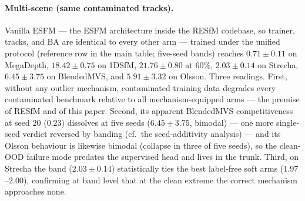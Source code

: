 \documentclass[10pt,twocolumn,letterpaper]{article}
\begin{document}
\paragraph{Multi-scene (same contaminated tracks).} Vanilla ESFM --- the ESFM
architecture inside the RESfM codebase, so trainer, tracks, and BA are identical to
every other arm --- trained under the unified protocol (reference row in the main
table; five-seed bands) reaches
$0.71\pm0.11$ on MegaDepth, $18.42\pm0.75$ on 1DSfM, $21.76\pm0.80$ at $60\%$,
$2.03\pm0.14$ on Strecha, $6.45\pm3.75$ on BlendedMVS, and $5.91\pm3.32$ on Olsson.
Three readings. First, without any outlier mechanism, contaminated training data
degrades every contaminated benchmark relative to all mechanism-equipped arms --- the
premise of RESfM and of this paper. Second, its apparent BlendedMVS competitiveness at
seed $20$ ($0.23$) dissolves at five seeds ($6.45\pm3.75$, bimodal) --- one more
single-seed verdict reversed by banding (cf.\ the seed-additivity analysis) --- and
its Olsson behaviour is likewise bimodal (collapse in three of five seeds), so the
clean-OOD failure mode predates the supervised head and lives in the trunk. Third, on
Strecha the band ($2.03\pm0.14$) statistically ties the best label-free soft arms
($1.97$--$2.00$), confirming at band level that at the clean extreme the correct
mechanism approaches none.
\end{document}
